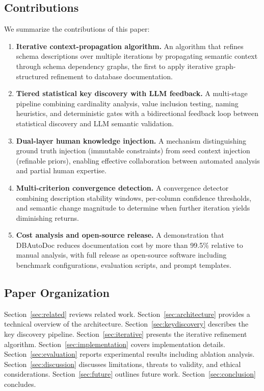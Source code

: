 \documentclass[sigconf, nonacm]{acmart}
\begin{document}
\subsection{Contributions}

We summarize the contributions of this paper:

\begin{enumerate}
    \item \textbf{Iterative context-propagation algorithm.} An algorithm that refines schema descriptions over multiple iterations by propagating semantic context through schema dependency graphs, the first to apply iterative graph-structured refinement to database documentation.

    \item \textbf{Tiered statistical key discovery with LLM feedback.} A multi-stage pipeline combining cardinality analysis, value inclusion testing, naming heuristics, and deterministic gates with a bidirectional feedback loop between statistical discovery and LLM semantic validation.

    \item \textbf{Dual-layer human knowledge injection.} A mechanism distinguishing ground truth injection (immutable constraints) from seed context injection (refinable priors), enabling effective collaboration between automated analysis and partial human expertise.

    \item \textbf{Multi-criterion convergence detection.} A convergence detector combining description stability windows, per-column confidence thresholds, and semantic change magnitude to determine when further iteration yields diminishing returns.

    \item \textbf{Cost analysis and open-source release.} A demonstration that DBAutoDoc reduces documentation cost by more than 99.5\% relative to manual analysis, with full release as open-source software including benchmark configurations, evaluation scripts, and prompt templates.
\end{enumerate}

\subsection{Paper Organization}

Section~\ref{sec:related} reviews related work. Section~\ref{sec:architecture} provides a technical overview of the architecture. Section~\ref{sec:keydiscovery} describes the key discovery pipeline. Section~\ref{sec:iterative} presents the iterative refinement algorithm. Section~\ref{sec:implementation} covers implementation details. Section~\ref{sec:evaluation} reports experimental results including ablation analysis. Section~\ref{sec:discussion} discusses limitations, threats to validity, and ethical considerations. Section~\ref{sec:future} outlines future work. Section~\ref{sec:conclusion} concludes.
\end{document}

